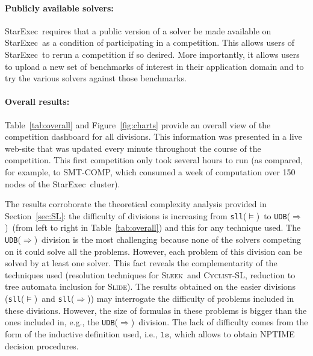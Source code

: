 \documentclass[twoside,11pt]{article}
\newcommand{\limp}{\Rightarrow}
\newcommand{\ls}{\mathtt{ls}}
\newcommand{\sllsat}{\texttt{sll}($\models$)}
\newcommand{\sllent}{\texttt{sll}($\limp$)}
\newcommand{\UDBent}{\texttt{UDB}($\limp$)}
\newcommand{\CYCLIST}{\textsc{Cyclist-SL}}
\newcommand{\SLEEK}{\textsc{Sleek}}
\newcommand{\SLIDE}{\textsc{Slide}}
\newcommand{\smtcomp}{\textsf{SMT-COMP}}
\newcommand{\starexec}{\textsf{StarExec}}
\begin{document}
\paragraph{Publicly available solvers:} \starexec\ requires that a public version of a solver be made available on \starexec\ as a condition of participating in a competition. This allows users of \starexec\ to rerun a competition if so desired. More importantly, it allows users to upload a new set of benchmarks of interest in their application domain and to try the various solvers against those benchmarks.

\paragraph{Overall results:}
Table~\ref{tab:overall} and Figure~\ref{fig:charts} provide an overall view of the competition dashboard for all divisions. This information was presented in a live web-site that was updated every minute throughout the course of the competition. This first competition only took several hours to run (as compared, for example, to \smtcomp, which consumed a week of computation over 150 nodes of the \starexec\ cluster).

The results corroborate the theoretical complexity analysis provided in Section~\ref{sec:SL}:
the difficulty of divisions is increasing from \sllsat\ to \UDBent\ (from left to right in Table~\ref{tab:overall}) and this for any technique used. 
The \UDBent\ division is the most challenging because none of the solvers competing on it could solve all the problems. However, each problem of this division can be solved by at least one solver. This fact reveals the complementarity of the techniques used (resolution techniques for \SLEEK\ and \CYCLIST, reduction to tree automata inclusion for \SLIDE).
The results obtained on the easier divisions (\sllsat\ and \sllent) may interrogate the difficulty of problems included in these divisions. However, the size of formulas in these problems is bigger than the ones included in, e.g., the \UDBent\ division. The lack of difficulty comes from the form of the inductive definition used, i.e., $\ls$, which allows to obtain NPTIME decision procedures.
\end{document}
